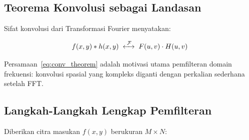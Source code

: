 \documentclass[12pt,a4paper]{article}
\begin{document}
\subsection{Teorema Konvolusi sebagai Landasan}

Sifat konvolusi dari Transformasi Fourier menyatakan:

\begin{equation}
  f(x,y) * h(x,y) \;\xleftrightarrow{\;\mathcal{F}\;}\; F(u,v) \cdot H(u,v)
  \label{eq:conv_theorem}
\end{equation}

Persamaan~\eqref{eq:conv_theorem} adalah motivasi utama pemfilteran domain
frekuensi: konvolusi spasial yang kompleks diganti dengan perkalian sederhana
setelah FFT.

\subsection{Langkah-Langkah Lengkap Pemfilteran}

Diberikan citra masukan $f(x,y)$ berukuran $M \times N$:
\end{document}
